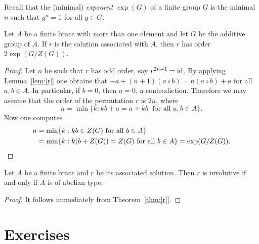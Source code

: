 Recall that the (minimal) \emph{exponent} $\exp(G)$ of a 
finite group $G$ is the minimal $n$ such that 
$g^n=1$ for all $g\in G$. 

\begin{theorem} 
\label{thm:|r|} 
  Let $A$ be a finite brace with more than one
  element and let $G$ be the additive group of $A$. 
  If $r$ is the solution associated with $A$, 
  then $r$ has order $2\exp(G/Z(G))$.
\end{theorem}

\begin{proof} 
  Let $n$ be such that $r$ has odd order, say $r^{2n+1}=\operatorname{id}$. By applying
  Lemma~\ref{lem:|r|} one obtains that $-a+(n+1)(a\circ b)=n(a\circ b)+a$
  for all $a,b\in A$. In particular, if $b=0$, then $a=0$, a contradiction. 
  Therefore we may assume that the order of the permutation $r$ is
  $2n$, where 
  \[
  n=\min\{k:kb+a=a+kb\;\text{ for all }a,b\in A\}.
  \]
  Now one computes
  \begin{align*} 
  n&=\min\{k:kb\in Z(G)\text{ for all }b\in A\}\\ 
  &=\min\{k:k(b+Z(G)) = Z(G)\text{ for all }b\in A\} =\exp(G/Z(G)).\qedhere
  \end{align*}
\end{proof}

\begin{corollary}
    Let $A$ be a finite brace and $r$ be its associated solution. Then 
    $r$ is involutive if and only if $A$ is of abelian type.  
\end{corollary}

\begin{proof}
    It follows immediately from Theorem~\ref{thm:|r|}.
\end{proof}








\section*{Exercises}

